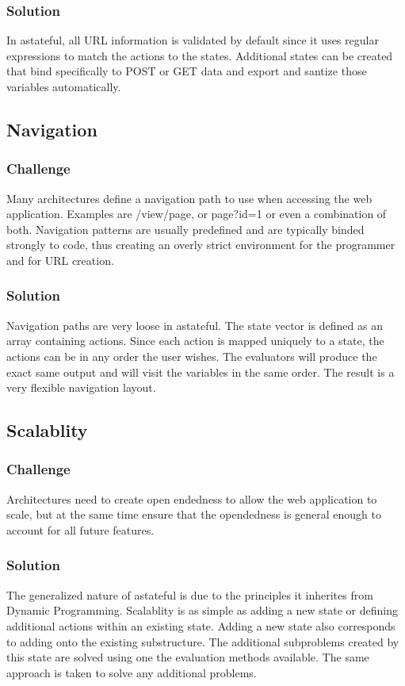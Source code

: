 \documentclass[11pt,twocolumn]{article}
\begin{document}
\subsubsection{Solution}
In astateful, all URL information is validated by default since it uses regular expressions to match the actions to the states. Additional states can be created that bind specifically to POST or GET data and export and santize those variables automatically.
\subsection{Navigation}
\subsubsection{Challenge}
Many architectures define a navigation path to use when accessing the web application. Examples are /view/page, or page?id=1 or even a combination of both. Navigation patterns are usually predefined and are typically binded strongly to code, thus creating an overly strict environment for the programmer and for URL creation.
\subsubsection{Solution}
Navigation paths are very loose in astateful. The state vector is defined as an array containing actions. Since each action is mapped uniquely to a state, the actions can be in any order the user wishes. The evaluators will produce the exact same output and will visit the variables in the same order. The result is a very flexible navigation layout.
\subsection{Scalablity}
\subsubsection{Challenge}
Architectures need to create open endedness to allow the web application to scale, but at the same time ensure that the opendedness is general enough to account for all future features.
\subsubsection{Solution}
The generalized nature of astateful is due to the principles it inherites from Dynamic Programming. Scalablity is as simple as adding a new state or defining additional actions within an existing state. Adding a new state also corresponds to adding onto the existing substructure. The additional subproblems created by this state are solved using one the evaluation methods available. The same approach is taken to solve any additional problems.
\end{document}

